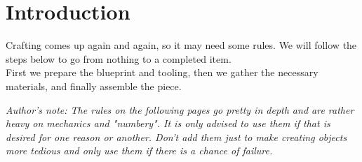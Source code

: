 \documentclass[12pt,a4paper,openany]{book}
\begin{document}
	

	\chapter{Introduction}
	Crafting comes up again and again, so it may need some rules. We will follow the steps below to go from nothing to a completed item.\\
	First we prepare the blueprint and tooling, then we gather the necessary materials, and finally assemble the piece.
	\par
	\vspace{5mm}
	\textit{Author's note: The rules on the following pages go pretty in depth and are rather heavy on mechanics and "numbery". 
	It is only advised to use them if that is desired for one reason or another. Don't add them just to make creating objects more tedious and only use them if there is a chance of failure.}
\end{document}
